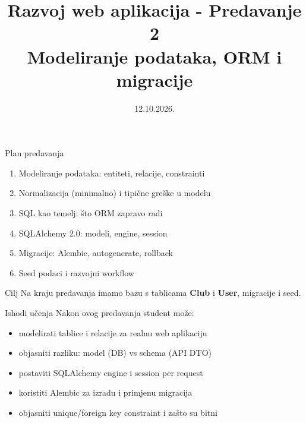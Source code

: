 

\title[Razvoj web aplikacija]{Razvoj web aplikacija - Predavanje 2 \\ Modeliranje podataka, ORM i migracije}
\date{12.10.2026.}


	
	\frame{\titlepage}
	
	\begin{frame}{Plan predavanja}
		\begin{enumerate}
			\item Modeliranje podataka: entiteti, relacije, constrainti
			\item Normalizacija (minimalno) i tipične greške u modelu
			\item SQL kao temelj: što ORM zapravo radi
			\item SQLAlchemy 2.0: modeli, engine, session
			\item Migracije: Alembic, autogenerate, rollback
			\item Seed podaci i razvojni workflow
		\end{enumerate}
		
		\vspace{0.4em}
		\begin{block}{Cilj}
			Na kraju predavanja imamo bazu s tablicama \textbf{Club} i \textbf{User}, migracije i seed.
		\end{block}
	\end{frame}
	
	\begin{frame}{Ishodi učenja}
		Nakon ovog predavanja student može:
		\begin{itemize}
			\item modelirati tablice i relacije za realnu web aplikaciju
			\item objasniti razliku: model (DB) vs schema (API DTO)
			\item postaviti SQLAlchemy engine i session per request
			\item koristiti Alembic za izradu i primjenu migracija
			\item objasniti unique/foreign key constraint i zašto su bitni
		\end{itemize}
	\end{frame}
	
